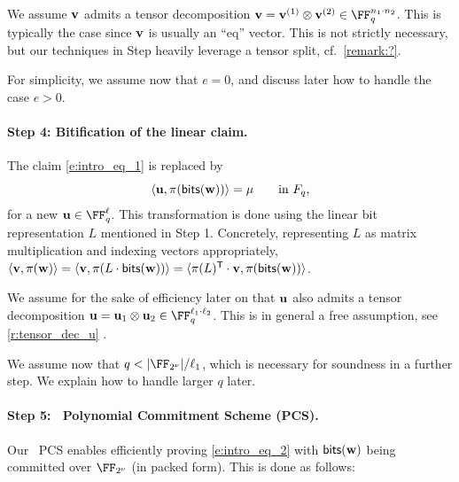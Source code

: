 \documentclass[11pt,letterpaper,usenames,dvipsnames]{article}
\begin{document}
We  assume $\mathbf{v}$ admits a tensor decomposition $\vv=\vv^{(1)} \otimes \vv^{(2)} \in \FF_q^{n_1 \cdot n_2}$. This is typically the case since $\mathbf{v}$ is usually an ``eq'' vector. This is not strictly necessary, but our techniques in Step  heavily leverage a tensor split, cf.\ \cref{remark:?}.

For simplicity, we assume now that $e=0$, and discuss later how to handle the case $e>0$. 



\paragraph{Step 4: Bitification of the linear claim.} The claim \eqref{e:intro_eq_1} is replaced by \begin{equation}\label{e:intro_eq_2}\langle \mathbf{u}, \pi(\mathsf{bits}(\mathbf{w}))\rangle =\mu \qquad \text{in  } F_{q},
\end{equation} 
for a new $\uu\in \FF_{q}^{\codedim}$. This transformation is done using the linear bit representation $L$ mentioned in Step 1. Concretely, representing $L$ as matrix multiplication and indexing vectors appropriately, $\langle \mathbf{v}, \pi(\mathbf{w})\rangle = \langle \mathbf{v}, \pi( L \cdot \mathsf{bits}(\mathbf{w})) \rangle = \langle \pi(L)^{\mathsf{T}}\cdot \mathbf{v}, \pi(\mathsf{bits}(\mathbf{w})) \rangle$.

We assume for the sake of efficiency later on that $\mathbf{u}$ also admits a tensor decomposition $\uu=\uu_1\otimes \uu_2 \in \FF_q^{\codedim_1 \cdot \codedim_2}$. This is in general a free assumption, see \cref{r:tensor_dec_u} .

We  assume now that $q< |\comfield|/\codedim_1$, which is necessary for soundness in a further step. We explain how to handle larger $q$ later.

     \paragraph{Step 5: \ftwoz \ Polynomial Commitment Scheme (PCS).} Our \ftwoz\  PCS  enables efficiently proving  \eqref{e:intro_eq_2} with $\mathsf{bits}(\mathbf{w})$ being committed over $\comfield$ (in packed form). This is done as follows:
\end{document}
